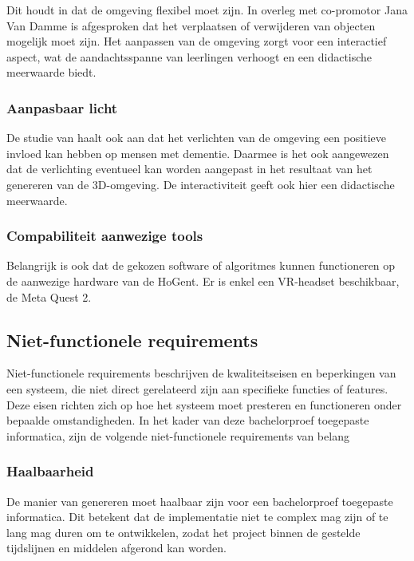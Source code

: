 Dit houdt in dat de omgeving flexibel moet zijn. In overleg met co-promotor Jana Van Damme is afgesproken dat het verplaatsen of verwijderen van objecten mogelijk moet zijn. Het aanpassen van de omgeving zorgt voor een interactief aspect, wat de aandachtsspanne van leerlingen verhoogt en een didactische meerwaarde biedt.

\subsubsection{Aanpasbaar licht}

De studie van \textcite{Raes2023} haalt ook aan dat het verlichten van de omgeving een positieve invloed kan hebben op mensen met dementie. Daarmee is het ook aangewezen dat de verlichting eventueel kan worden aangepast in het resultaat van het genereren van de 3D-omgeving. De interactiviteit geeft ook hier een didactische meerwaarde.

\subsubsection{Compabiliteit aanwezige tools}

Belangrijk is ook dat de gekozen software of algoritmes kunnen functioneren op de aanwezige hardware van de HoGent. Er is enkel een VR-headset beschikbaar, de Meta Quest 2. 

\subsection{Niet-functionele requirements}

Niet-functionele requirements beschrijven de kwaliteitseisen en beperkingen van een systeem, die niet direct gerelateerd zijn aan specifieke functies of features. Deze eisen richten zich op hoe het systeem moet presteren en functioneren onder bepaalde omstandigheden. In het kader van deze bachelorproef toegepaste informatica, zijn de volgende niet-functionele requirements van belang

\subsubsection{Haalbaarheid}

De manier van genereren moet haalbaar zijn voor een bachelorproef toegepaste informatica. Dit betekent dat de implementatie niet te complex mag zijn of te lang mag duren om te ontwikkelen, zodat het project binnen de gestelde tijdslijnen en middelen afgerond kan worden.



